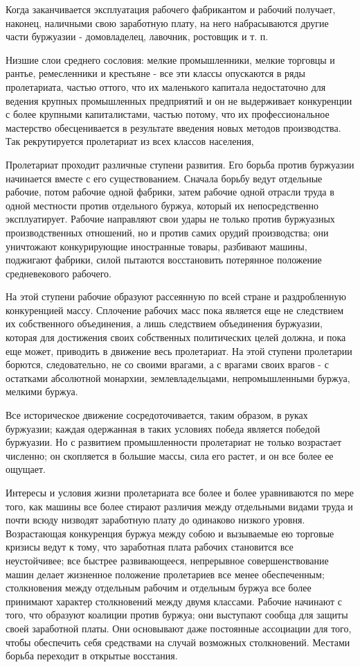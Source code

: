 \documentclass[12pt]{article}
\newcommand{\parnum}{(\arabic{parcount})}
\newcounter{parcount}
\newenvironment{parnumbers}{%
  \par%
  \everypar{\noindent \stepcounter{parcount}\marginpar[]{\parnum}}%
}{}
\begin{document}
\begin{parnumbers}
    Когда заканчивается эксплуатация рабочего фабрикантом и рабочий получает, наконец, наличными свою заработную плату, на него набрасываются другие части буржуазии - домовладелец, лавочник, ростовщик и т. п.

    Низшие слои среднего сословия: мелкие промышленники, мелкие торговцы и рантье, ремесленники и крестьяне - все эти классы опускаются в ряды пролетариата, частью оттого, что их маленького капитала недостаточно для ведения крупных промышленных предприятий и он не выдерживает конкуренции с более крупными капиталистами, частью потому, что их профессиональное мастерство обесценивается в результате введения новых методов производства. Так рекрутируется пролетариат из всех классов населения,

    Пролетариат проходит различные ступени развития. Его борьба против буржуазии начинается вместе с его существованием. Сначала борьбу ведут отдельные рабочие, потом рабочие одной фабрики, затем рабочие одной отрасли труда в одной местности против отдельного буржуа, который их непосредственно эксплуатирует. Рабочие направляют свои удары не только против буржуазных производственных отношений, но и против самих орудий производства; они уничтожают конкурирующие иностранные товары, разбивают машины, поджигают фабрики, силой пытаются восстановить потерянное положение средневекового рабочего.

    На этой ступени рабочие образуют рассеянную по всей стране и раздробленную конкуренцией массу. Сплочение рабочих масс пока является еще не следствием их собственного объединения, а лишь следствием объединения буржуазии, которая для достижения своих собственных политических целей должна, и пока еще может, приводить в движение весь пролетариат. На этой ступени пролетарии борются, следовательно, не со своими врагами, а с врагами своих врагов - с остатками абсолютной монархии, землевладельцами, непромышленными буржуа, мелкими буржуа.

    Все историческое движение сосредоточивается, таким образом, в руках буржуазии; каждая одержанная в таких условиях победа является победой буржуазии. Но с развитием промышленности пролетариат не только возрастает численно; он скопляется в большие массы, сила его растет, и он все более ее ощущает.

    Интересы и условия жизни пролетариата все более и более уравниваются по мере того, как машины все более стирают различия между отдельными видами труда и почти всюду низводят заработную плату до одинаково низкого уровня. Возрастающая конкуренция буржуа между собою и вызываемые ею торговые кризисы ведут к тому, что заработная плата рабочих становится все неустойчивее; все быстрее развивающееся, непрерывное совершенствование машин делает жизненное положение пролетариев все менее обеспеченным; столкновения между отдельным рабочим и отдельным буржуа все более принимают характер столкновений между двумя классами. Рабочие начинают с того, что образуют коалиции против буржуа; они выступают сообща для защиты своей заработной платы. Они основывают даже постоянные ассоциации для того, чтобы обеспечить себя средствами на случай возможных столкновений. Местами борьба переходит в открытые восстания.


\end{parnumbers}
\end{document}
